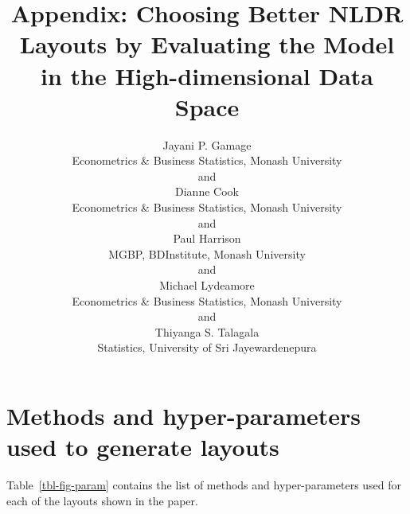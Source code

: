 \documentclass[
  12pt]{article}
\begin{document}
\def\spacingset#1{\renewcommand{\baselinestretch}%
{#1}\small\normalsize} \spacingset{1}



\title{\bf Appendix: Choosing Better NLDR Layouts by Evaluating the
Model in the High-dimensional Data Space}
\author{
Jayani P. Gamage\\
Econometrics \& Business Statistics, Monash University\\
and\\Dianne Cook\\
Econometrics \& Business Statistics, Monash University\\
and\\Paul Harrison\\
MGBP, BDInstitute, Monash University\\
and\\Michael Lydeamore\\
Econometrics \& Business Statistics, Monash University\\
and\\Thiyanga S. Talagala\\
Statistics, University of Sri Jayewardenepura\\
}
\maketitle

\bigskip
\bigskip
\begin{abstract}

\end{abstract}


\newpage
\spacingset{1.9} %


\section{Methods and hyper-parameters used to generate
layouts}\label{methods-and-hyper-parameters-used-to-generate-layouts}

Table~\ref{tbl-fig-param} contains the list of methods and
hyper-parameters used for each of the layouts shown in the paper.

\begingroup\fontsize{12}{14}\selectfont
\end{document}
